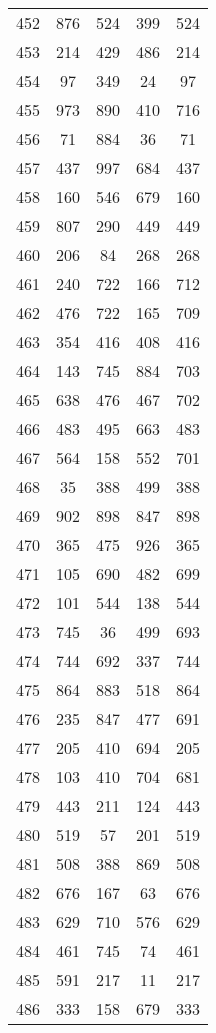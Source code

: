 \documentclass[a4paper,10pt,ngerman]{scrartcl}
\begin{document}
\begin{longtable}[c]{c|c|c|c|c}
    452 & 876 & 524 & 399 & 524 \\
    453 & 214 & 429 & 486 & 214 \\
    454 & 97 & 349 & 24 & 97 \\
    455 & 973 & 890 & 410 & 716 \\
    456 & 71 & 884 & 36 & 71 \\
    457 & 437 & 997 & 684 & 437 \\
    458 & 160 & 546 & 679 & 160 \\
    459 & 807 & 290 & 449 & 449 \\
    460 & 206 & 84 & 268 & 268 \\
    461 & 240 & 722 & 166 & 712 \\
    462 & 476 & 722 & 165 & 709 \\
    463 & 354 & 416 & 408 & 416 \\
    464 & 143 & 745 & 884 & 703 \\
    465 & 638 & 476 & 467 & 702 \\
    466 & 483 & 495 & 663 & 483 \\
    467 & 564 & 158 & 552 & 701 \\
    468 & 35 & 388 & 499 & 388 \\
    469 & 902 & 898 & 847 & 898 \\
    470 & 365 & 475 & 926 & 365 \\
    471 & 105 & 690 & 482 & 699 \\
    472 & 101 & 544 & 138 & 544 \\
    473 & 745 & 36 & 499 & 693 \\
    474 & 744 & 692 & 337 & 744 \\
    475 & 864 & 883 & 518 & 864 \\
    476 & 235 & 847 & 477 & 691 \\
    477 & 205 & 410 & 694 & 205 \\
    478 & 103 & 410 & 704 & 681 \\
    479 & 443 & 211 & 124 & 443 \\
    480 & 519 & 57 & 201 & 519 \\
    481 & 508 & 388 & 869 & 508 \\
    482 & 676 & 167 & 63 & 676 \\
    483 & 629 & 710 & 576 & 629 \\
    484 & 461 & 745 & 74 & 461 \\
    485 & 591 & 217 & 11 & 217 \\
    486 & 333 & 158 & 679 & 333 \\

\end{longtable}
\end{document}
